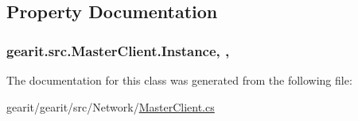 \subsection{Property Documentation}
\hypertarget{classgearit_1_1src_1_1_master_client_aa8623817e3a0e39360d9135e267fa63a}{
\subsubsection[{Instance}]{ gearit.\+src.\+Master\+Client.\+Instance\hspace{0.3cm}{\ttfamily [static]}, {\ttfamily [get]}, {\ttfamily [set]}}}\label{classgearit_1_1src_1_1_master_client_aa8623817e3a0e39360d9135e267fa63a}


The documentation for this class was generated from the following file\+:\begin{DoxyCompactItemize}
\item 
gearit/gearit/src/\+Network/\hyperlink{_master_client_8cs}{Master\+Client.\+cs}\end{DoxyCompactItemize}

